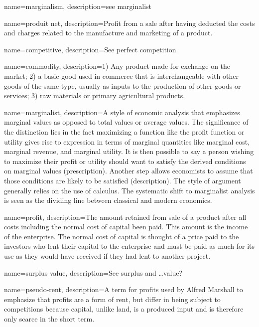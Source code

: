 {
name=marginalism,
description={see \gls{marginalist}}
}

{
name=produit net,
description={Profit from a sale after having deducted the costs and charges related to the manufacture and marketing of a product.}
}

{
name=competitive,
description={See \gls{perfect competition}.}
}

{
name=commodity,
description={1) Any product  made for exchange on the market; 2) a basic good used in commerce that is interchangeable with other goods of the same type, usually  as inputs to the production of other goods or services; 3) raw materials or primary agricultural products.}
}

{
name=marginalist,
description={A style of economic analysis that emphasizes marginal values as opposed to total values or average values. The significance of the distinction lies in the fact maximizing a function like the profit function or utility gives rise to expression in terms of marginal quantities like marginal cost, marginal revenue, and marginal utility. It is then possible to say a person wishing to maximize their profit or utility should want to satisfy the derived conditions on marginal values (prescription). Another step allows economists to assume that those conditions are likely to be satisfied (description). The style of argument generally relies on the use of calculus. The systematic shift to marginalist analysis is seen as the dividing line between classical and modern economics.}
}

{
name=profit,
description={The amount retained from sale of a product after all costs including the normal cost of capital  been paid. This amount is the income of the enterprise. The normal cost of capital is thought of a price paid to the investors who lent their capital to the enterprise and must be paid as  much for its use as they would have received if they had lent to another project. }
}

{
name=surplus value,
description={See \gls{surplus} and \dots value?}
}

{
name=pseudo-rent,
description={A term for profits used by Alfred Marshall to emphasize that profits are a form of rent, but differ in being subject to competitions because capital, unlike land, is a produced input and is therefore only scarce in the short term. }
}

